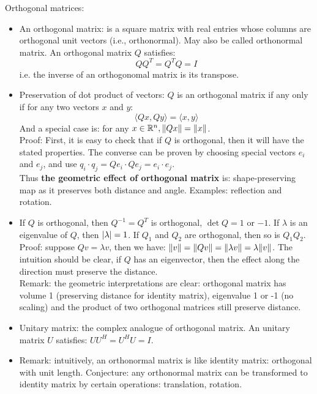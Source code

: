 \documentclass{report}
\begin{document}
Orthogonal matrices:
\begin{itemize}
\item An orthogonal matrix: is a square matrix with real entries whose columns are orthogonal unit vectors (i.e., orthonormal). May also be called orthonormal matrix. An orthogonal matrix $Q$ satisfies: 
\begin{equation}
Q Q^T = Q^T Q = I
\end{equation}
i.e. the inverse of an orthogonomal matrix is its transpose. 
	
\item Preservation of dot product of vectors: $Q$ is an orthogonal matrix if any only if for any two vectors $x$ and $y$:
\begin{equation}
\langle Qx, Qy \rangle = \langle x,y \rangle
\end{equation}
And a special case is: for any $x \in \mathbb{R}^n, \lVert Qx\rVert = \lVert x\rVert$. \\
Proof: First, it is easy to check that if $Q$ is orthogonal, then it will have the stated properties. The converse can be proven by choosing special vectors $e_i$ and $e_j$, and use $q_i \cdot q_j = Q e_i \cdot Q e_j = e_i \cdot e_j$. \\
Thus \textbf{the geometric effect of orthogonal matrix} is: shape-preserving map as it preserves both distance and angle. Examples: reflection and rotation.  
	
\item If $Q$ is orthogonal, then $Q^{-1} = Q^T$ is orthogonal, $\det Q = 1$ or $-1$. If $\lambda$ is an eigenvalue of $Q$, then $\lvert\lambda\rvert = 1$. If $Q_1$ and $Q_2$ are orthogonal, then so is $Q_1 Q_2$. \\
Proof: suppose $Q v = \lambda v$, then we have: $\lVert v\rVert = \lVert Qv\rVert = \lVert\lambda v\rVert = \lambda \lVert v\rVert$. The intuition should be clear, if $Q$ has an eigenvector, then the effect along the direction must preserve the distance. \\
Remark: the geometric interpretations are clear: orthogonal matrix has volume 1 (preserving distance for identity matrix), eigenvalue 1 or -1 (no scaling) and the product of two orthogonal matrices still preserve distance.  

\item Unitary matrix: the complex analogue of orthogonal matrix. An unitary matrix $U$ satisfies: $U U^H = U^H U = I$. 

\item Remark: intuitively, an orthonormal matrix is like identity matrix: orthogonal with unit length. Conjecture: any orthonormal matrix can be transformed to identity matrix by certain operations: translation, rotation. 
\end{itemize}
\end{document}
